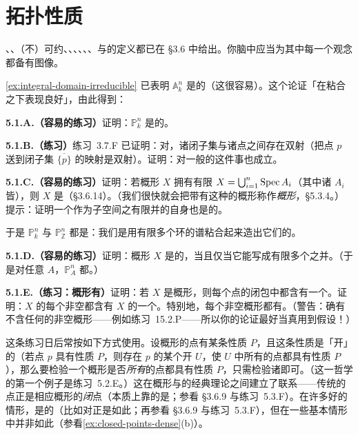 
\section{拓扑性质}

\trConnected、\trConnectedComponent、（不）可约、\trIrreducibleComponent、\trQuasicompact、\trGenerization、\trSpecialization、\trGenericPoint、\trNoetherian{}\trTopologicalSpace{}与\trClosedPoint{}的定义都已在 \S3.6 中给出。你脑中应当为其中每一个观念都备有图像。

\cref{ex:integral-domain-irreducible} 已表明 $\mathbb{A}^n_k$ 是\trIrreducible{}的（这很容易）。这个论证「在粘合之下表现良好」，由此得到：

\textbf{5.1.A.（容易的练习）}\quad 证明：$\mathbb{P}^n_k$ 是\trIrreducible{}的。

\textbf{5.1.B.（练习）}\quad 练习~3.7.F 已证明：对\trAffineScheme，诸\trIrreducible{}闭子集与诸点之间存在双射（把点 $p$ 送到闭子集 $\overline{\{p\}}$ 的映射是双射）。证明：对一般的\trScheme{}这件事也成立。

\textbf{5.1.C.（容易的练习）}\quad 证明：若概形 $X$ 拥有有限\trCover{} $X=\bigcup_{i=1}^{n}\operatorname{Spec} A_i$（其中诸 $A_i$ 皆\trNoetherian），则 $X$ 是\trNoetherian{}\trTopologicalSpace（\S3.6.14）。（我们很快就会把带有这种\trCover{}的概形称作\emph{\trNoetherian{}概形}，\S5.3.4。）提示：证明一个作为\trNoetherian{}子空间之有限并的\trTopologicalSpace{}自身也是\trNoetherian{}的。

于是 $\mathbb{P}^n_k$ 与 $\mathbb{P}^n_{\mathbb{Z}}$ 都是\trNoetherian{}\trTopologicalSpace：我们是用有限多个\trNoetherian{}环的谱粘合起来造出它们的。

\textbf{5.1.D.（容易的练习）}\quad 证明：概形 $X$ 是\trQuasicompact{}的，当且仅当它能写成有限多个\trAffine\trOpenSubscheme{}之并。（于是对任意\trRing{} $A$，$\mathbb{P}^n_A$ 都\trQuasicompact。）

\textbf{5.1.E.（练习：\trQuasicompact{}概形有\trClosedPoint）}\quad 证明：若 $X$ 是\trQuasicompact{}概形，则每个点的闭包中都含有一个\trClosedPoint。证明：$X$ 的每个非空\trClosedSubset{}都含有 $X$ 的一个\trClosedPoint。特别地，每个非空\trQuasicompact{}概形都有\trClosedPoint。（警告：确有不含任何\trClosedPoint{}的非空概形——例如练习~15.2.P——所以你的论证最好当真用到\trQuasicompactness{}假设！）

这条练习日后常按如下方式使用。设概形的点有某条性质 $P$，且这条性质是「开」的（若点 $p$ 具有性质 $P$，则存在 $p$ 的某个开\trNeighborhood{} $U$，使 $U$ 中所有的点都具有性质 $P$），那么要检验一个\trQuasicompact{}概形是否\emph{所有}的点都具有性质 $P$，只需检验诸\trClosedPoint{}即可。（这一哲学的第一个例子是练习~5.2.E。）这在概形与\trVariety{}的经典理论之间建立了联系——传统\trVariety{}的点正是相应概形的\emph{闭}点（本质上靠的是\trNullstellensatz；参看 \S3.6.9 与练习~5.3.F）。在许多好的情形，\trClosedPoint{}是\trDense{}的（比如对\trVariety{}正是如此；再参看 \S3.6.9 与练习~5.3.F），但在一些基本情形中并非如此（参看\cref{ex:closed-points-dense}(b)）。

